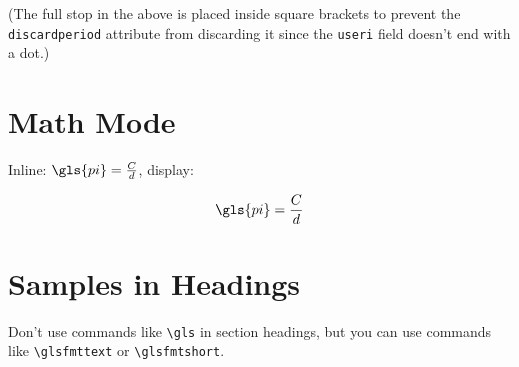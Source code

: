 \documentclass[fontsize=10pt,open=any]{scrbook}
\begin{document}
(The full stop in the above is placed inside square brackets
to prevent the \verb|discardperiod| attribute from discarding it
since the \verb|useri| field doesn't end with a dot.)

\chapter{Math Mode}
Inline: $\gls{pi} = \frac{C}{d}$, display:

\[
 \gls{pi} = \frac{C}{d}
\]

\chapter{Samples in Headings}

Don't use commands like \verb|\gls| in section headings, but you can
use commands like \verb|\glsfmttext| or \verb|\glsfmtshort|.



\renewcommand{\glossarypreamble}{\emph{This glossary uses the style 
`\csuse{@glossary@default@style}' with modifications made
through categories and their attributes.}\par\medskip}
\printglossaries
\end{document}
